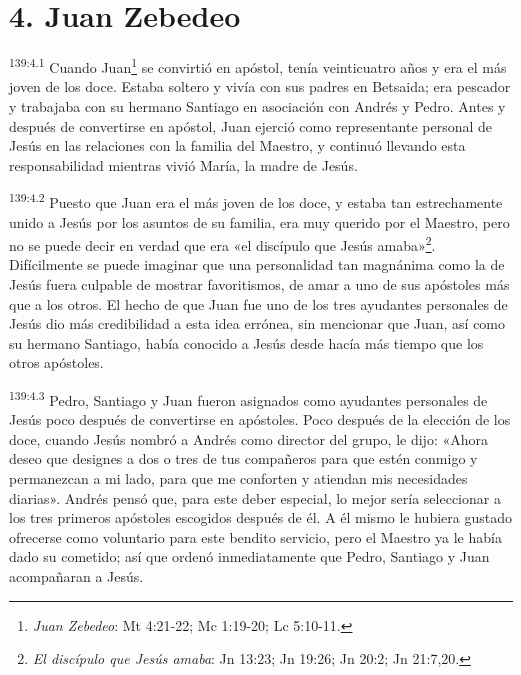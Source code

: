\section*{4. Juan Zebedeo}
\par
\textsuperscript{139:4.1} Cuando Juan\footnote{\textit{Juan Zebedeo}: Mt 4:21-22; Mc 1:19-20; Lc 5:10-11.} se convirtió en apóstol, tenía veinticuatro años y era el más joven de los doce. Estaba soltero y vivía con sus padres en Betsaida; era pescador y trabajaba con su hermano Santiago en asociación con Andrés y Pedro. Antes y después de convertirse en apóstol, Juan ejerció como representante personal de Jesús en las relaciones con la familia del Maestro, y continuó llevando esta responsabilidad mientras vivió María, la madre de Jesús.

\par
\textsuperscript{139:4.2} Puesto que Juan era el más joven de los doce, y estaba tan estrechamente unido a Jesús por los asuntos de su familia, era muy querido por el Maestro, pero no se puede decir en verdad que era «el discípulo que Jesús amaba»\footnote{\textit{El discípulo que Jesús amaba}: Jn 13:23; Jn 19:26; Jn 20:2; Jn 21:7,20.}. Difícilmente se puede imaginar que una personalidad tan magnánima como la de Jesús fuera culpable de mostrar favoritismos, de amar a uno de sus apóstoles más que a los otros. El hecho de que Juan fue uno de los tres ayudantes personales de Jesús dio más credibilidad a esta idea errónea, sin mencionar que Juan, así como su hermano Santiago, había conocido a Jesús desde hacía más tiempo que los otros apóstoles.

\par
\textsuperscript{139:4.3} Pedro, Santiago y Juan fueron asignados como ayudantes personales de Jesús poco después de convertirse en apóstoles. Poco después de la elección de los doce, cuando Jesús nombró a Andrés como director del grupo, le dijo: «Ahora deseo que designes a dos o tres de tus compañeros para que estén conmigo y permanezcan a mi lado, para que me conforten y atiendan mis necesidades diarias». Andrés pensó que, para este deber especial, lo mejor sería seleccionar a los tres primeros apóstoles escogidos después de él. A él mismo le hubiera gustado ofrecerse como voluntario para este bendito servicio, pero el Maestro ya le había dado su cometido; así que ordenó inmediatamente que Pedro, Santiago y Juan acompañaran a Jesús.

